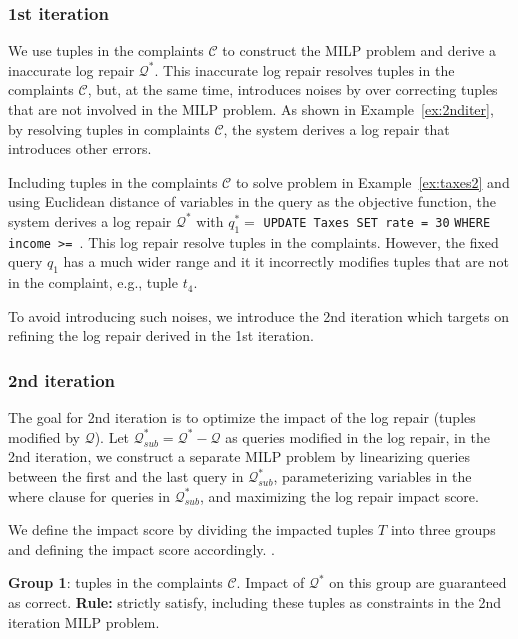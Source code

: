 \subsubsection{1st iteration}
We use tuples in the complaints $\mathcal{C}$ to construct the MILP problem and derive a 
inaccurate log repair $\mathcal{Q}^*$. This inaccurate 
log repair resolves tuples in the complaints $\mathcal{C}$, but, at the same time, 
introduces noises by over correcting tuples that are not involved in the MILP problem. 
As shown in Example~\ref{ex:2nditer}, by resolving tuples in complaints $\mathcal{C}$, 
the system derives a log repair that introduces other errors. 
\begin{example}\label{ex:2nditer}
Including tuples in the complaints $\mathcal{C}$ to solve problem in Example~\ref{ex:taxes2} 
and using Euclidean distance of variables in the query as the objective function, the system 
derives a log repair $\mathcal{Q}^*$ with $q_1^*=$ \texttt{\small UPDATE Taxes SET rate = 30}
\texttt{\small WHERE income >= \color{red}{9500.0001} \color{black}{and income <=} \color{red}{90000}}. 
This log repair resolve tuples in the complaints. However, the fixed query $q_1$ has a much wider range 
and it it incorrectly modifies tuples that are not in the complaint, e.g., tuple $t_4$.
\end{example}

To avoid introducing such noises, we introduce the 
2nd iteration which targets on refining the log repair derived in 
the 1st iteration. 
\subsubsection{2nd iteration}
The goal for 2nd iteration is to optimize the impact of the log repair (tuples
modified by $\mathcal{Q}$). 
Let $\mathcal{Q}^*_{sub} = \mathcal{Q}^*-\mathcal{Q}$ as 
queries modified in the log repair, in the 2nd iteration, we 
construct a separate MILP problem by linearizing 
 queries between the first and the last query in
$\mathcal{Q}^*_{sub}$, parameterizing variables in 
the where clause for queries in $\mathcal{Q}^*_{sub}$,
and maximizing the log repair impact score. 

We define the impact score by dividing the 
impacted tuples $T$ into three groups and defining the 
impact score accordingly. . 

\smallskip

\noindent\textbf{Group 1}: tuples in the complaints $\mathcal{C}$. Impact of 
$\mathcal{Q}^*$ on this group
are guaranteed as correct. \textbf{Rule:} 
strictly satisfy, including these tuples as 
constraints in the 2nd iteration MILP problem. 

